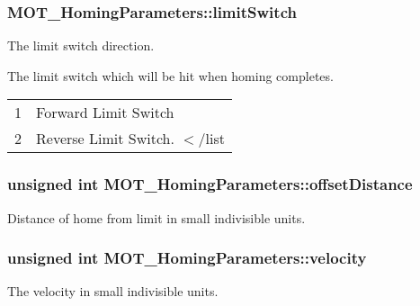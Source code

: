 \subsubsection[{\texorpdfstring{limit\+Switch}{limitSwitch}}]{ M\+O\+T\+\_\+\+Homing\+Parameters\+::limit\+Switch}\hypertarget{struct_m_o_t___homing_parameters_ab64d2806f38fa72a8df49fd870882f98}{}\label{struct_m_o_t___homing_parameters_ab64d2806f38fa72a8df49fd870882f98}


The limit switch direction. 

The limit switch which will be hit when homing completes. \tabulinesep=1mm
\begin{longtabu} spread 0pt [c]{*2{|X[-1]}|}
&Forward Limit Switch \\
2&Reverse Limit Switch. $<$/list\\
\end{longtabu}
\subsubsection[{\texorpdfstring{offset\+Distance}{offsetDistance}}]{\setlength{\rightskip}{0pt plus 5cm}unsigned int M\+O\+T\+\_\+\+Homing\+Parameters\+::offset\+Distance}\hypertarget{struct_m_o_t___homing_parameters_a251f800551a5e608ef5cb5b4ccb273b4}{}\label{struct_m_o_t___homing_parameters_a251f800551a5e608ef5cb5b4ccb273b4}


Distance of home from limit in small indivisible units. 

\subsubsection[{\texorpdfstring{velocity}{velocity}}]{\setlength{\rightskip}{0pt plus 5cm}unsigned int M\+O\+T\+\_\+\+Homing\+Parameters\+::velocity}\hypertarget{struct_m_o_t___homing_parameters_af9765ed6807401164426e93056cf27a1}{}\label{struct_m_o_t___homing_parameters_af9765ed6807401164426e93056cf27a1}


The velocity in small indivisible units. 


